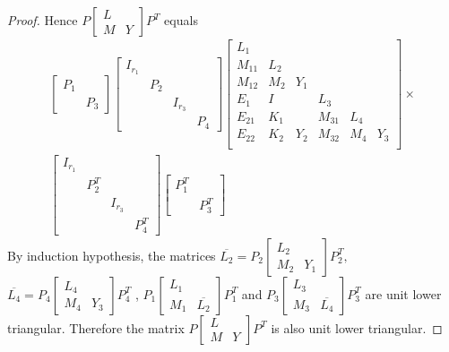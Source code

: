 \documentclass{article}
\begin{document}
\begin{proof}
Hence $ P \left[\begin{matrix}L \\M&Y\end{matrix}\right] P^T $ equals
\begin{equation*}
    \begin{split}
      \begin{bmatrix}P_1\\&P_3 \end{bmatrix}
      \begin{bmatrix} I_{r_1}\\&P_2\\&&I_{r_3}\\&&&P_4 \end{bmatrix}
      \left[
        \begin{array}{ccccccc}
          L_1  \\
          M_{11} & L_2\\
          M_{12} & M_2 &Y_1&       \\
          \hline
          E_1   &  I  &&L_3\\
          E_{21} &K_1 & &M_{31}  & L_4\\
          E_{22} &K_2 & Y_2&M_{32}  & M_4&Y_3\\
        \end{array}
      \right] \times
\\
    \begin{bmatrix}  I_{r_1}\\&P_2^T\\&&I_{r_3}\\&&&P_4^T \end{bmatrix}
    \begin{bmatrix}  P_1^T\\&P_3^T\end{bmatrix}
\end{split}
   \end{equation*}
By induction hypothesis, the matrices
$\overline{L_2}=P_2 \begin{bmatrix}L_2\\M_2&Y_1\end{bmatrix}P_2^T,$
$\overline{L_4}=P_4 \begin{bmatrix}L_4\\M_4&Y_3\end{bmatrix}P_4^T$
,
$P_1
\begin{bmatrix}
  L_1\\
  M_1&\overline{L_2}
\end{bmatrix}
P_1^T
$
and
$P_3
\begin{bmatrix}
  L_3\\
  M_3&\overline{L_4}
\end{bmatrix}
P_3^T
$ are unit lower triangular. Therefore the matrix  $P
\left[\begin{smallmatrix}
  L\\
  M&Y
\end{smallmatrix}\right]
P^T$ is also unit lower triangular.


\end{proof}
\end{document}

